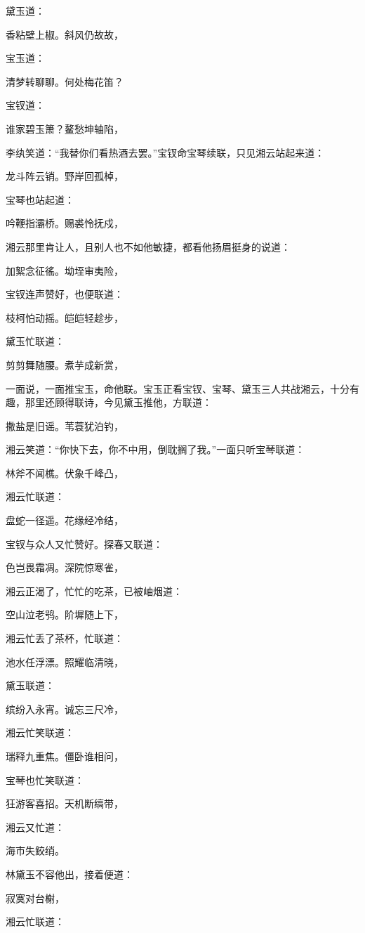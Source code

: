 黛玉道：

香粘壁上椒。斜风仍故故，

宝玉道：

清梦转聊聊。何处梅花笛？

宝钗道：

谁家碧玉箫？鳌愁坤轴陷，

李纨笑道：“我替你们看热酒去罢。”宝钗命宝琴续联，只见湘云站起来道：

龙斗阵云销。野岸回孤棹，

宝琴也站起道：

吟鞭指灞桥。赐裘怜抚戍，

湘云那里肯让人，且别人也不如他敏捷，都看他扬眉挺身的说道：

加絮念征徭。坳垤审夷险，

宝钗连声赞好，也便联道：

枝柯怕动摇。皑皑轻趁步，

黛玉忙联道：

剪剪舞随腰。煮芋成新赏，

一面说，一面推宝玉，命他联。宝玉正看宝钗、宝琴、黛玉三人共战湘云，十分有趣，那里还顾得联诗，今见黛玉推他，方联道：

撒盐是旧谣。苇蓑犹泊钓，

湘云笑道：“你快下去，你不中用，倒耽搁了我。”一面只听宝琴联道：

林斧不闻樵。伏象千峰凸，

湘云忙联道：

盘蛇一径遥。花缘经冷结，

宝钗与众人又忙赞好。探春又联道：

色岂畏霜凋。深院惊寒雀，

湘云正渴了，忙忙的吃茶，已被岫烟道：

空山泣老鸮。阶墀随上下，

湘云忙丢了茶杯，忙联道：

池水任浮漂。照耀临清晓，

黛玉联道：

缤纷入永宵。诚忘三尺冷，

湘云忙笑联道：

瑞释九重焦。僵卧谁相问，

宝琴也忙笑联道：

狂游客喜招。天机断缟带，

湘云又忙道：

海市失鲛绡。

林黛玉不容他出，接着便道：

寂寞对台榭，

湘云忙联道：

